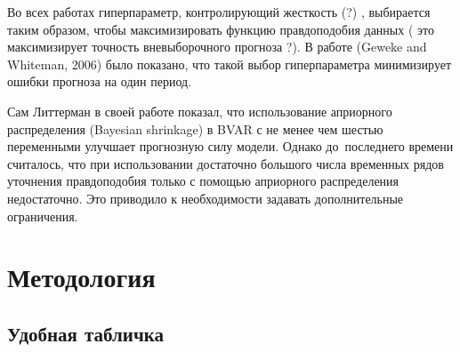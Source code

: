 \documentclass[11pt]{article} %
\begin{document}
Во всех работах гиперпараметр, контролирующий жесткость (?) , выбирается таким образом, чтобы максимизировать функцию правдоподобия  данных ( это максимизирует точность вневыборочного прогноза ?). В работе (Geweke and Whiteman, 2006) было показано, что такой выбор гиперпараметра минимизирует ошибки прогноза на один период.


Сам Литтерман в своей работе показал, что использование априорного распределения (Bayesian shrinkage) в BVAR с  не менее  чем шестью переменными  улучшает прогнозную силу модели. Однако до~последнего времени считалось, что при использовании достаточно большого числа временных рядов уточнения правдоподобия только с помощью априорного распределения недостаточно.  Это приводило к необходимости задавать дополнительные ограничения.

\section{Методология}

\subsection{Удобная табличка}
\end{document}
